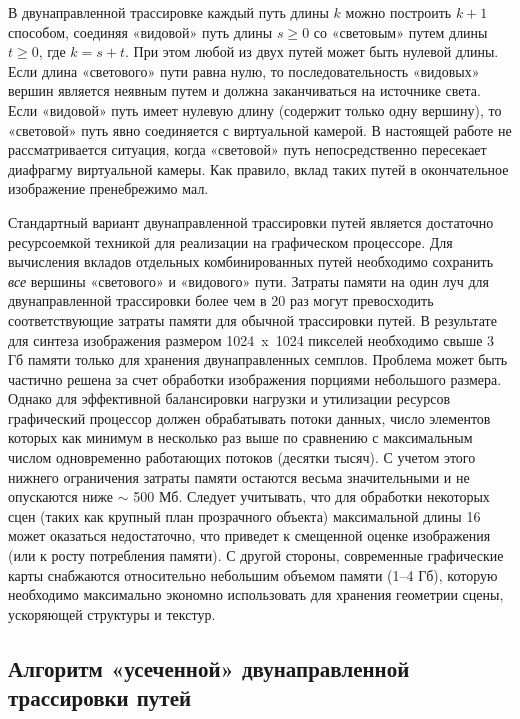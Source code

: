 В двунаправленной трассировке каждый путь длины $k$ можно построить $k + 1$ способом, соединяя «видовой» путь длины $s \ge 0$ со «световым» путем длины $t \ge 0$, где $k = s + t$. При этом любой из двух путей может быть нулевой длины. Если длина «светового» пути равна нулю, то последовательность «видовых» вершин является неявным путем и должна заканчиваться на источнике света. Если «видовой» путь имеет нулевую длину (содержит только одну вершину), то «световой» путь явно соединяется с виртуальной камерой. В настоящей работе не рассматривается ситуация, когда «световой» путь непосредственно пересекает диафрагму виртуальной камеры. Как правило, вклад таких путей в окончательное изображение пренебрежимо мал.

Стандартный вариант двунаправленной трассировки путей является достаточно ресурсоемкой техникой для реализации на графическом процессоре. Для вычисления вкладов отдельных комбинированных путей необходимо сохранить \textit{все} вершины «светового» и «видового» пути. Затраты памяти на один луч для двунаправленной трассировки более чем в 20 раз могут превосходить соответствующие затраты памяти для обычной трассировки путей. В результате для синтеза изображения размером 1024 x 1024 пикселей необходимо свыше 3 Гб памяти только для хранения двунаправленных семплов. Проблема может быть частично решена за счет обработки изображения порциями небольшого размера. Однако для эффективной балансировки нагрузки и утилизации ресурсов графический процессор должен обрабатывать потоки данных, число элементов которых как минимум в несколько раз выше по сравнению с максимальным числом одновременно работающих потоков (десятки тысяч). С учетом этого нижнего ограничения затраты памяти остаются весьма значительными и не опускаются ниже $\sim$ 500 Мб. Следует учитывать, что для обработки некоторых сцен (таких как крупный план прозрачного объекта) максимальной длины 16 может оказаться недостаточно, что приведет к смещенной оценке изображения (или к росту потребления памяти). С другой стороны, современные графические карты снабжаются относительно небольшим объемом памяти (1–4 Гб), которую необходимо максимально экономно использовать для хранения геометрии сцены, ускоряющей структуры и текстур.

\subsection{Алгоритм «усеченной» двунаправленной трассировки путей}

